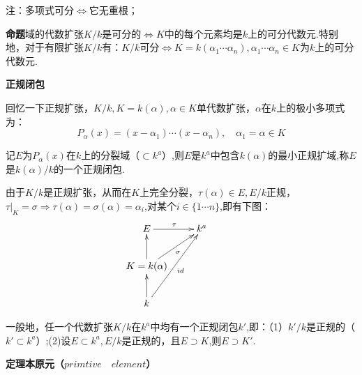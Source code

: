 \documentclass[UTF8]{article}
\begin{document}
注：多项式可分$\Longleftrightarrow$它无重根；

\textbf{命题}\quad 域的代数扩张$K/k$是可分的$\Longleftrightarrow K$中的每个元素均是$k$上的可分代数元.特别地，对于有限扩张$K/k$有：$K/k$可分$\Longleftrightarrow K=k(\alpha_1\cdots\alpha_n),\alpha_1\cdots\alpha_n\in K$为$k$上的可分代数元.

\textbf{正规闭包}

回忆一下正规扩张，$K/k,K=k(\alpha),\alpha\in K $单代数扩张，$\alpha$在$k$上的极小多项式为：$$P_{\alpha}(x)=(x-\alpha_1)\cdots(x-\alpha_n),\quad \alpha_1=\alpha\in K$$

记$E$为$P_{\alpha}(x)$在$k$上的分裂域（$\subset k^a$）,则$E$是$k^a$中包含$k(\alpha)$的最小正规扩域,称$E$是$k(\alpha)/k$的一个正规闭包.

由于$K/k$是正规扩张，从而在$K$上完全分裂，$\tau(\alpha)\in E,E/k$正规，$\tau|_K=\sigma \Rightarrow \tau(\alpha)=\sigma(\alpha)=\alpha_i$,对某个$i\in \{1\cdots n\}$,即有下图：
$$\xymatrix{E\ar[r]^{\tau}&{k^a}\\K=k(\alpha)\ar[u]\ar[ru]_{\sigma}\\k\ar[u]\ar[ruu]_{id}&&}$$

一般地，任一个代数扩张$K/k$在$k^a$中均有一个正规闭包$k'$,即：（1）$k'/k$是正规的（$k'\subset k^a$）;(2)设$E\subset k^a,E/k$是正规的，且$E\supset K$,则$E\supset K'$.

\textbf{定理\quad 本原元（$primtive\quad element$）}
\end{document}
